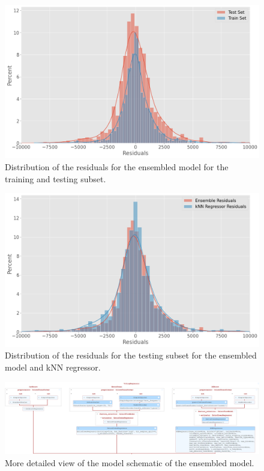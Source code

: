 \begin{figure}
    \centering
        \centering
        \includegraphics[width=\textwidth]{"content/pics/Distribution_Residuals.png"}
        \caption{Distribution of the residuals for the ensembled model for the training and testing subset.}
        \label{fig:}
\end{figure}
\begin{figure}
    \centering
        \centering
        \includegraphics[width=\textwidth]{"content/pics/Distribution_Residuals_Ensemble_kNN.png"}
        \caption{Distribution of the residuals for the testing subset for the ensembled model and kNN regressor.}
        \label{fig:}
\end{figure}
\begin{figure}
    \centering
        \centering
        \includegraphics[width=\textwidth]{"content/pics/Ensembled_Model.png"}
        \caption{More detailed view of the model schematic of the ensembled model.}
        \label{fig:}
\end{figure}
